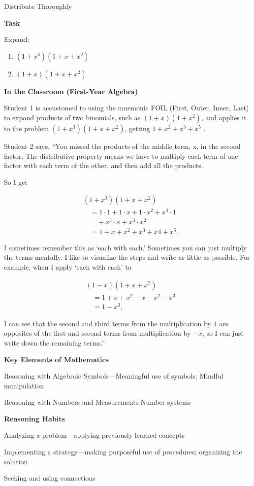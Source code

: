 \documentclass[
  10pt,
  a4paper,
  landscape,
  twoside,
  openany
]{scrbook}
\newcounter{example}
\begin{document}
\TriExample
{
Distribute Thoroughly
}
{
\noindent
\textbf{Task}

Expand:

\begin{enumerate}
  \item [(a)] $(1 + x^3)(1 + x + x^2)$
  \item [(b)] $(1 + x)(1 + x + x^2)$
\end{enumerate}

\noindent
\textbf{In the Classroom (First-Year Algebra)}

Student 1 is accustomed to using the mnemonic FOIL (First, Outer, Inner, Last) to expand products of two binomials, such as $(1 + x)(1 + x^2)$, and applies it to the problem $(1 + x^3)(1 + x + x^2)$, getting $1 + x^2 + x^3 + x^5$ .

Student 2 says, ``You missed the products of the middle term, x, in the second factor. The distributive property means we have to multiply each term of one factor with each term of the other, and then add all the products.

So I get

$$
\begin{aligned}
  &(1 + x^3)(1 + x + x^2) \\ 
    &\quad= 1 \cdot 1 + 1 \cdot x + 1 \cdot x^2 + x^3 \cdot 1\\
    &\qquad + x^3 \cdot x + x^3 \cdot x^2 \\
    &\quad= 1 + x + x^2 + x^3 + x4 + x^5.
\end{aligned}
$$

I sometimes remember this as `each with each.' Sometimes you can just multiply the terms mentally. I like to visualize the steps and write as little as possible. For example, when I apply `each with each' to

$$
\begin{aligned}
  &(1 - x)(1 + x + x^2) \\
  &\quad = 1 + x + x^2 - x - x^2 - x^3 \\
  &\quad = 1 - x^3,
\end{aligned}
$$

I can see that the second and third terms from the multiplication by $1$ are opposites of the first and second terms from multiplication by $-x$, so I can just write down the remaining terms.''

\noindent
\textbf{Key Elements of Mathematics}

Reasoning with Algebraic Symbols---Meaningful use of symbols; Mindful manipulation

Reasoning with Numbers and Measurements-Number systems

\noindent
\textbf{Reasoning Habits}

Analyzing a problem---applying previously learned concepts

Implementing a strategy---making purposeful use of procedures; organizing the solution

Seeking and using connections
}
\end{document}
